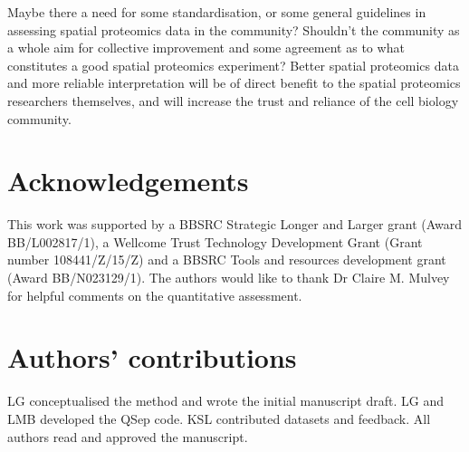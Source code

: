 \documentclass[12pt]{article}\usepackage[]{graphicx}\usepackage[]{color}
\begin{document}
Maybe there a need for some standardisation, or some general
guidelines in assessing spatial proteomics data in the community?
Shouldn't the community as a whole aim for collective improvement and
some agreement as to what constitutes a good spatial proteomics experiment?
Better spatial proteomics data and more reliable interpretation will
be of direct benefit to the spatial proteomics researchers themselves,
and will increase the trust and reliance of the cell biology
community.

\section*{Acknowledgements}

This work was supported by a BBSRC Strategic Longer and Larger grant
(Award BB/L002817/1), a Wellcome Trust Technology Development Grant
(Grant number 108441/Z/15/Z) and a BBSRC Tools and resources
development grant (Award BB/N023129/1). The authors would like to
thank Dr Claire M. Mulvey for helpful comments on the quantitative
assessment.

\section*{Authors' contributions}

LG conceptualised the method and wrote the initial manuscript
draft. LG and LMB developed the QSep code. KSL contributed datasets
and feedback. All authors read and approved the manuscript.

\newpage
\end{document}
